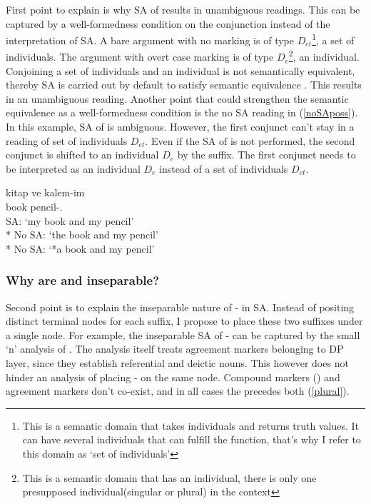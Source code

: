 First point to explain is why SA of {\Case} results in unambiguous readings. This can be captured by a well-formedness condition on the conjunction instead of the interpretation of SA. A bare argument with no {\Case} marking is of type $D_{et}$\footnote{This is a semantic domain that takes individuals and returns truth values. It can have several individuals that can fulfill the function, that's why I refer to this domain as `set of individuals'}, a set of individuals. The argument with overt case marking is of type $D_e$\footnote{This is a semantic domain that has an individual, there is only one presupposed individual(singular or plural) in the context}, an individual. Conjoining a set of individuals and an individual is not semantically equivalent, thereby {\Case} SA is carried out by default to satisfy semantic equivalence \citep{munn1993topics}. This results in an unambiguous reading. Another point that could strengthen the semantic equivalence as a well-formedness condition is the no SA reading in (\ref{noSAposs}). In this example, SA of {\Poss} is ambiguous. However, the first conjunct can't stay in a reading of set of individuals $D_{et}$. Even if the SA of {\Poss} is not performed, the second conjunct is shifted to an individual $D_e$ by the {\Poss} suffix. The first conjunct needs to be interpreted as an individual $D_{e}$ instead of a set of individuals $D_{et}$.

\begin{exe}
    \ex \label{noSAposs}
    \gll kitap ve kalem-im \\ book {\And} pencil-{\Poss.\Fsg} \\
    \glt SA: `my book and my pencil'\\*
    No SA: `the book and my pencil'\\*
    No SA: `*a book and my pencil'
\end{exe}


\subsubsection{Why are {\Pl} and {\Poss} inseparable?}

Second point is to explain the inseparable nature of {\Pl-\Poss} in SA. Instead of positing distinct terminal nodes for each suffix, I propose to place these two suffixes under a single node. For example, the inseparable SA of {\Pl-\Poss} can be captured by the small `n' analysis of \cite{ozturk2016possessive}. The analysis itself treats agreement markers belonging to DP layer, since they establish referential and deictic nouns. This however does not hinder an analysis of placing {\Pl-\Poss} on the same node. Compound markers ({\Tsg}) and agreement markers don't co-exist, and in all cases the {\Pl} precedes both (\ref{plural}).

